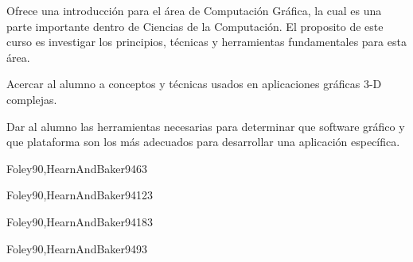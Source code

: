 \begin{syllabus}


\begin{justification}
Ofrece una introducción para el área de Computación Gráfica, la
cual es una parte importante dentro de Ciencias de la Computación.
El proposito de este curso es investigar los principios, técnicas
y herramientas fundamentales para esta área.
\end{justification}

\begin{goals}
\item Acercar al alumno a conceptos y técnicas usados en aplicaciones gráficas 3-D complejas.
\item Dar al alumno las herramientas necesarias para determinar que software gráfico y que plataforma son los más adecuados para desarrollar una aplicación específica.
\end{goals}

\begin{outcomes}
\end{outcomes}

\begin{unit}{\GVGraphicSystemsDef}{Foley90,HearnAndBaker94}{6}{3}
	\GVGraphicSystemsAllTopics
	\GVGraphicSystemsAllObjectives
\end{unit}

\begin{unit}{\GVFundamentalTechniquesDef}{Foley90,HearnAndBaker94}{12}{3}
	\GVFundamentalTechniquesAllTopics
	\GVFundamentalTechniquesAllObjectives
\end{unit}

\begin{unit}{\GVBasicRenderingDef}{Foley90,HearnAndBaker94}{18}{3}
	\GVBasicRenderingAllTopics
	\GVBasicRenderingAllObjectives
\end{unit}

\begin{unit}{\GVGeometricModelingDef}{Foley90,HearnAndBaker94}{9}{3}
	\GVGeometricModelingAllTopics
	\GVGeometricModelingAllObjectives
\end{unit}



\begin{coursebibliography}
\end{coursebibliography}

\end{syllabus}
